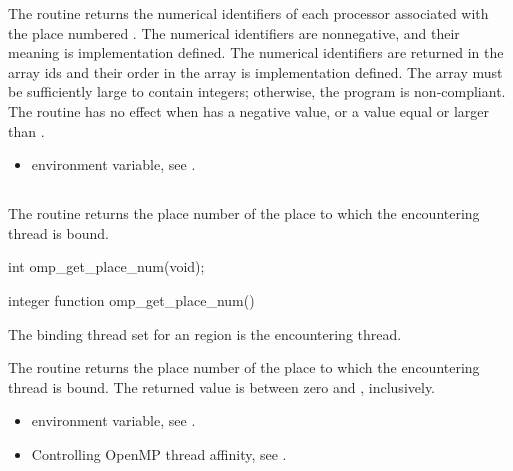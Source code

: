 \effect
The  routine returns the numerical identifiers of each processor associated with the place numbered . The numerical identifiers are nonnegative, and their meaning is implementation defined.  The numerical identifiers are returned in the array ids and their order in the array is implementation defined. The array must be sufficiently large to contain  integers; otherwise, the program is non-compliant.  The routine has no effect when  has a negative value, or a value equal or larger than .

\crossreferences
\begin{itemize}
\item {} environment variable, see 
.
\end{itemize}




\subsection{}
\label{subsec:omp_get_place_num}

\summary
The  routine returns the place number of the place to which the encountering thread is bound.

\format
\ccppspecificstart
\begin{boxedcode}
int omp\_get\_place\_num(void);
\end{boxedcode}
\ccppspecificend

\fortranspecificstart
\begin{boxedcode}
integer function omp\_get\_place\_num()
\end{boxedcode}
\fortranspecificend

\binding
The binding thread set for an  region is the encountering thread.

\effect
The  routine returns the place number of the place to which the encountering thread is bound. The returned value is between zero and , inclusively.

\crossreferences
\begin{itemize}
\item {} environment variable, see 
.

\item Controlling OpenMP thread affinity, see 
. 
\end{itemize}





